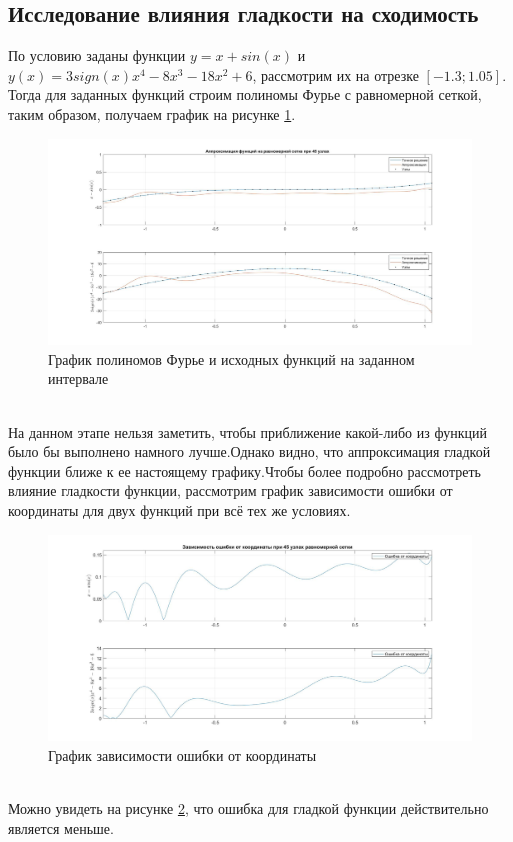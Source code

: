 \documentclass[a4paper]{article}
\begin{document}
\subsection{Исследование влияния гладкости на сходимость} 
По условию заданы функции $ y = x+sin(x)$ и $ y(x) = 3sign(x)x^{4}-8x^{3}-18x^{2}+6$, рассмотрим их на отрезке $[-1.3;1.05]$. Тогда для заданных функций строим полиномы Фурье с равномерной сеткой, таким образом, получаем график на рисунке \ref{Рис2}.
\begin{figure}[h!]
\begin{center}
\includegraphics[scale=0.3]{функция и аппроксимация.jpg} 
\end{center}
\caption{График полиномов Фурье и исходных функций на заданном интервале} \label{Рис2}
\end{figure}\\
На данном этапе нельзя заметить, чтобы приближение какой-либо из функций было бы выполнено намного лучше.Однако видно, что аппроксимация гладкой функции ближе к ее настоящему графику.Чтобы более подробно рассмотреть влияние гладкости функции, рассмотрим график зависимости ошибки от координаты для двух функций при всё тех же условиях.
\begin{figure}[h!]
\begin{center}
\includegraphics[scale=0.3]{зависимость ошибка от координаты.jpg} 
\end{center}
\caption{График зависимости ошибки от координаты} \label{Рис3}
\end{figure}\\
Можно увидеть на рисунке \ref{Рис3}, что ошибка для гладкой функции действительно является меньше.
\end{document}
